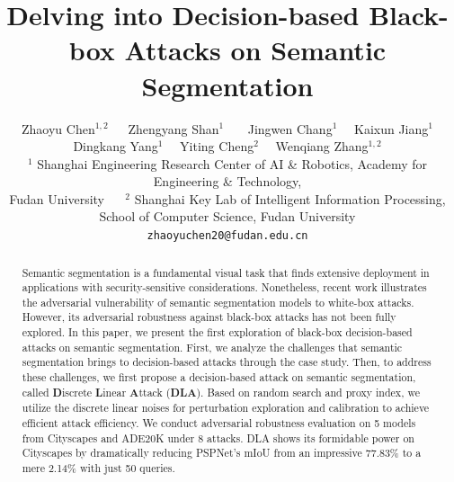 \documentclass[10pt,twocolumn,letterpaper]{article}
\begin{document}
\title{Delving into Decision-based Black-box Attacks on Semantic Segmentation}

\author{Zhaoyu Chen$^{1,2}$\footnotemark[1]$\ $$\quad$
        Zhengyang Shan$^{1}$\footnotemark[1]$\ $ $\quad$
        Jingwen Chang$^{1}\quad$
        Kaixun Jiang$^{1}$\\
        Dingkang Yang$^{1}\quad$
        Yiting Cheng$^{2}\quad$ 
        Wenqiang Zhang$^{1,2}$ \\ 
        $^1$ Shanghai Engineering Research Center of AI \& Robotics, Academy for Engineering \& Technology, \\ Fudan University $\quad$
        $^2$ Shanghai Key Lab of Intelligent Information Processing, \\ School of Computer Science, Fudan University \\
        {\tt\small{zhaoyuchen20@fudan.edu.cn}}
}

\maketitle

\renewcommand{\thefootnote}{\fnsymbol{footnote}}

\begin{abstract}
Semantic segmentation is a fundamental visual task that finds extensive deployment in applications with security-sensitive considerations. Nonetheless, recent work illustrates the adversarial vulnerability of semantic segmentation models to white-box attacks. However, its adversarial robustness against black-box attacks has not been fully explored. In this paper, we present the first exploration of black-box decision-based attacks on semantic segmentation. First, we analyze the challenges that semantic segmentation brings to decision-based attacks through the case study. Then, to address these challenges, we first propose a decision-based attack on semantic segmentation, called \textbf{D}iscrete \textbf{L}inear \textbf{A}ttack (\textbf{DLA}). Based on random search and proxy index, we utilize the discrete linear noises for perturbation exploration and calibration to achieve efficient attack efficiency. We conduct adversarial robustness evaluation on 5 models from Cityscapes and ADE20K under 8 attacks. DLA shows its formidable power on Cityscapes by dramatically reducing PSPNet's mIoU from an impressive 77.83\% to a mere 2.14\% with just 50 queries.
\end{abstract}
\end{document}
